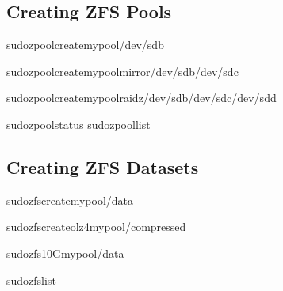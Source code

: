 \documentclass[letterpaper,10pt,english]{sphinxmanual}
\begin{document}
\subsection{Creating ZFS Pools}
\label{\detokenize{volume-management:creating-zfs-pools}}
\begin{sphinxVerbatim}[commandchars=\\\{\}]
sudozpoolcreatemypool/dev/sdb

sudozpoolcreatemypoolmirror/dev/sdb/dev/sdc

sudozpoolcreatemypoolraidz/dev/sdb/dev/sdc/dev/sdd

sudozpoolstatus
sudozpoollist
\end{sphinxVerbatim}


\subsection{Creating ZFS Datasets}
\label{\detokenize{volume-management:creating-zfs-datasets}}
\begin{sphinxVerbatim}[commandchars=\\\{\}]
sudozfscreatemypool/data

sudozfscreate\PYGZhy{}olz4mypool/compressed

sudozfs10Gmypool/data

sudozfslist
\end{sphinxVerbatim}
\end{document}
